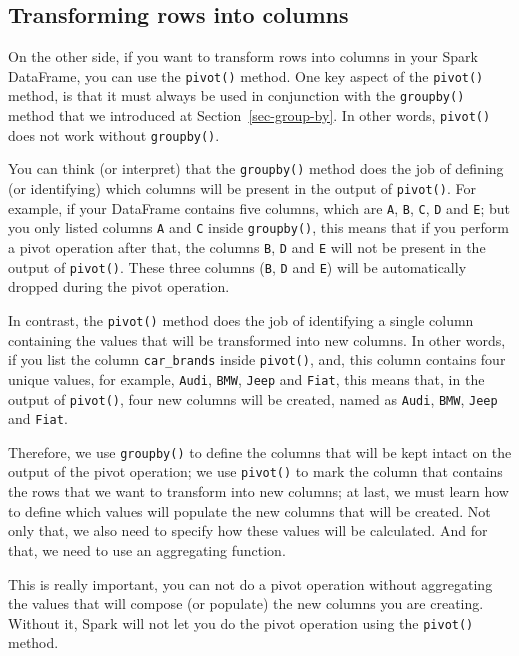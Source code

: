 \documentclass[
  11pt,
  letterpaper,
  DIV=11,
  numbers=noendperiod]{scrreprt}
\begin{document}
\subsection{Transforming rows into
columns}\label{transforming-rows-into-columns}

On the other side, if you want to transform rows into columns in your
Spark DataFrame, you can use the \texttt{pivot()} method. One key aspect
of the \texttt{pivot()} method, is that it must always be used in
conjunction with the \texttt{groupby()} method that we introduced at
Section~\ref{sec-group-by}. In other words, \texttt{pivot()} does not
work without \texttt{groupby()}.

You can think (or interpret) that the \texttt{groupby()} method does the
job of defining (or identifying) which columns will be present in the
output of \texttt{pivot()}. For example, if your DataFrame contains five
columns, which are \texttt{A}, \texttt{B}, \texttt{C}, \texttt{D} and
\texttt{E}; but you only listed columns \texttt{A} and \texttt{C} inside
\texttt{groupby()}, this means that if you perform a pivot operation
after that, the columns \texttt{B}, \texttt{D} and \texttt{E} will not
be present in the output of \texttt{pivot()}. These three columns
(\texttt{B}, \texttt{D} and \texttt{E}) will be automatically dropped
during the pivot operation.

In contrast, the \texttt{pivot()} method does the job of identifying a
single column containing the values that will be transformed into new
columns. In other words, if you list the column \texttt{car\_brands}
inside \texttt{pivot()}, and, this column contains four unique values,
for example, \texttt{Audi}, \texttt{BMW}, \texttt{Jeep} and
\texttt{Fiat}, this means that, in the output of \texttt{pivot()}, four
new columns will be created, named as \texttt{Audi}, \texttt{BMW},
\texttt{Jeep} and \texttt{Fiat}.

Therefore, we use \texttt{groupby()} to define the columns that will be
kept intact on the output of the pivot operation; we use
\texttt{pivot()} to mark the column that contains the rows that we want
to transform into new columns; at last, we must learn how to define
which values will populate the new columns that will be created. Not
only that, we also need to specify how these values will be calculated.
And for that, we need to use an aggregating function.

This is really important, you can not do a pivot operation without
aggregating the values that will compose (or populate) the new columns
you are creating. Without it, Spark will not let you do the pivot
operation using the \texttt{pivot()} method.
\end{document}
